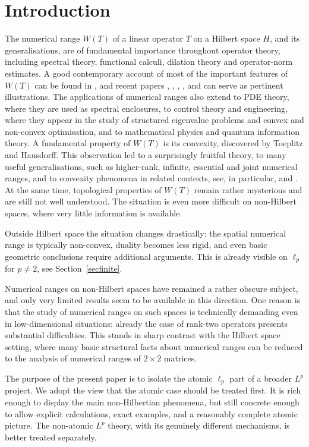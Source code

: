 \documentclass[11pt]{amsart}
\numberwithin{equation}{section}
\theoremstyle{definition}
\theoremstyle{remark}
\begin{document}
\tableofcontents


\section*{Introduction}
The numerical range $W(T)$ of a linear operator $T$ on a Hilbert space $H$, and its generalisations, are of fundamental importance throughout operator theory, including spectral theory, functional calculi, dilation theory and operator-norm estimates. 
A good contemporary account of most of the important features of $W(T)$ can be found in \cite{GW}, and recent papers \cite{AglerLykovaYoung2024}, \cite{Bickel2020}, \cite{BHSVW2025},  \cite{Bogli2020}, \cite{LauLiPoonSze2018}
and \cite{Malman2025} can serve as pertinent illustrations.
 The applications of numerical ranges also extend to PDE theory, where they are used as spectral enclosures, to control theory and engineering, where they appear in the study of structured eigenvalue problems and convex and non-convex optimisation, and to mathematical physics and quantum information theory. A fundamental property of $W(T)$ is its convexity, discovered by Toeplitz and Hausdorff. This observation led to a surprisingly fruitful theory, to many useful generalisations, such as higher-rank, infinite, essential and joint numerical ranges, and to convexity phenomena in related contexts, see, in particular, \cite{GW} and \cite{GR}. At the same time, topological properties of $W(T)$ remain rather mysterious and are still not well understood. The situation is even more difficult on non-Hilbert spaces, where very little information is available.

Outside Hilbert space the situation changes drastically: the spatial numerical range is typically non-convex, duality becomes less rigid, and even basic geometric conclusions require additional arguments.
This is already visible on $\ell_p$ for $p\neq2$, see Section~\ref{secfinite}.

Numerical ranges on non-Hilbert spaces have remained a rather obscure subject, and only very limited results seem to be available in this direction. One reason is that the study of numerical ranges on such spaces is technically demanding even in low-dimensional situations: already the case of rank-two operators presents substantial difficulties. This stands in sharp contrast with the Hilbert space setting, where many basic structural facts about numerical ranges can be reduced to the analysis of numerical ranges of $2\times2$ matrices.

The purpose of the present paper is to isolate the atomic $\ell_p$ part of a broader $L^p$ project. We adopt the view that the atomic case should be treated first. It is rich enough to display the main non-Hilbertian phenomena, but still concrete enough to allow explicit calculations, exact examples, and a reasonably complete atomic picture. The non-atomic $L^p$ theory, with its genuinely different mechanisms, is better treated separately.
\end{document}
